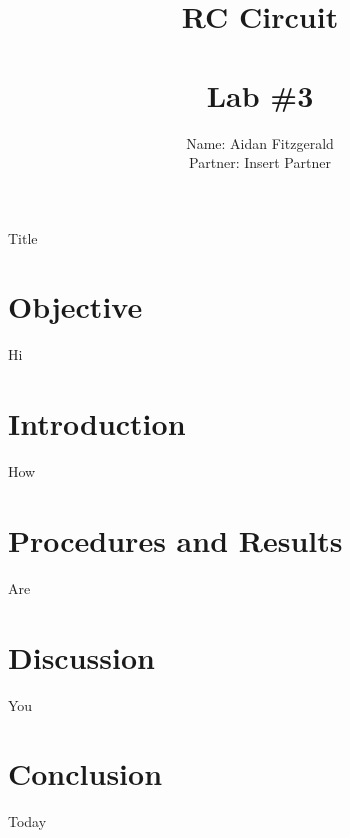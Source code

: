 \documentclass[11pt, titlepage]{article}
\title{\textbf{RC Circuit} \\ \ \\ \large Lab \#3 }
\author{Name: Aidan Fitzgerald \\ Partner: Insert Partner}
\date{}
\begin{document}
\maketitle

\begin{center}
\LARGE Title
\end{center}

\section*{Objective}
Hi

\section*{Introduction}
How

\section*{Procedures and Results}
Are

\section*{Discussion}
You

\section*{Conclusion}
Today
\end{document}
